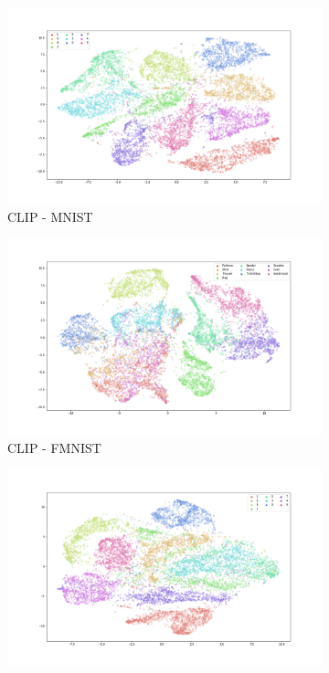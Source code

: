 \documentclass{article}
\theoremstyle{definition}
\begin{document}
\begin{figure}[h!]
\begin{subfigure}{.48\textwidth}
        \includegraphics[width=\linewidth]{Final project/img/MNIST_clip-vit-base-patch32_train.png}
        \caption{CLIP - MNIST}
    \end{subfigure}
    \begin{subfigure}{.48\textwidth}
        \includegraphics[width=\linewidth]{Final project/img/FMNIST_clip-vit-base-patch32_train.png}
        \caption{CLIP - FMNIST}
    \end{subfigure}
    \begin{subfigure}{.48\textwidth}
        \includegraphics[width=\linewidth]{Final project/img/MNIST_vit-base-patch32-384_train.png}

\end{subfigure}
\end{figure}
\end{document}
